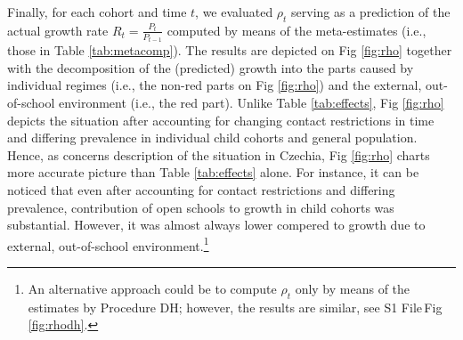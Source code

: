 \documentclass[fleqn,10pt]{wlscirep}
\def\supfile{S1 File\,}
\begin{document}
Finally, for each cohort and time $t$, we evaluated $\rho_t$ serving as a prediction of the actual growth rate $R_t = \frac{P_{t}}{P_{t-1}}$ computed by means of the meta-estimates (i.e., those in Table \ref{tab:metacomp}). The results are depicted on Fig \ref{fig:rho} together with the decomposition of the (predicted) growth into the parts caused by individual regimes (i.e., the non-red parts on Fig \ref{fig:rho}) and the external, out-of-school environment (i.e., the red part). Unlike Table \ref{tab:effects}, Fig \ref{fig:rho} depicts the situation after accounting for changing contact restrictions in time and differing prevalence in individual child cohorts and general population. Hence, as concerns description of the situation in Czechia, Fig \ref{fig:rho} charts more accurate picture than Table \ref{tab:effects} alone. For instance, it can be noticed that even after accounting for contact restrictions and differing prevalence, contribution of open schools to growth in child cohorts was substantial. However, it was almost always lower compered to growth due to external, out-of-school environment.\footnote{An alternative approach could be to compute $\rho_t$ only by means of the estimates by Procedure DH; however, the results are similar, see \supfile Fig \ref{fig:rhodh}.}


     
\end{document}
